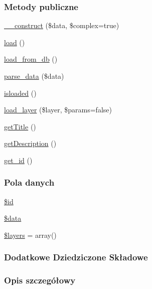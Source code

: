 \subsubsection*{Metody publiczne}
\begin{DoxyCompactItemize}
\item 
\hyperlink{classep___object_a8c384d5e0f13f64cbf8c51096faa7738}{\-\_\-\-\_\-construct} (\$data, \$complex=true)
\item 
\hyperlink{classep___object_a4dcaa8f72c8423d4de25a9e87fa6f3e4}{load} ()
\item 
\hyperlink{classep___object_a16e862a2b83507e636da4d2255935e78}{load\-\_\-from\-\_\-db} ()
\item 
\hyperlink{classep___object_ac313783ab7146c71e639bf7ddf54b0db}{parse\-\_\-data} (\$data)
\item 
\hyperlink{classep___object_a86cd9c33a728ce9abfcf0141434a4685}{isloaded} ()
\item 
\hyperlink{classep___object_a2a98b8e18d13cdc780c0eb53a77985b2}{load\-\_\-layer} (\$layer, \$params=false)
\item 
\hyperlink{classep___object_a95e859a4588a39a1824b717378a84c29}{get\-Title} ()
\item 
\hyperlink{classep___object_a2e7bb35c71bf1824456ceb944cb7a845}{get\-Description} ()
\item 
\hyperlink{classep___object_a8a94003b9d888b085c68d6eac44be175}{get\-\_\-id} ()
\end{DoxyCompactItemize}
\subsubsection*{Pola danych}
\begin{DoxyCompactItemize}
\item 
\hyperlink{classep___object_ae97941710d863131c700f069b109991e}{\$id}
\item 
\hyperlink{classep___object_a6efc15b5a2314dd4b5aaa556a375c6d6}{\$data}
\item 
\hyperlink{classep___object_a56b31ecb84a0f78f558158981557e0dd}{\$layers} = array()
\end{DoxyCompactItemize}
\subsubsection*{Dodatkowe Dziedziczone Składowe}


\subsubsection{Opis szczegółowy}


